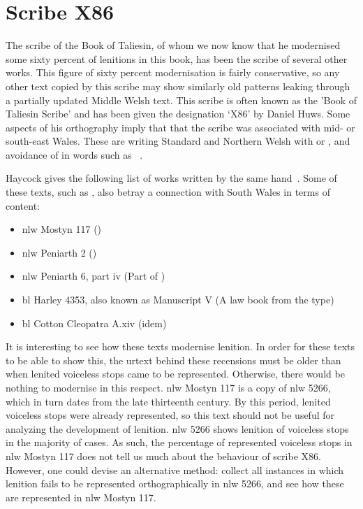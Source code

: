 \chapter{Scribe X86}
The scribe of the Book of Taliesin, of whom we now know that he modernised some sixty percent of lenitions in this book, has been the scribe of several other works. This figure of sixty percent modernisation is fairly conservative, so any other text copied by this scribe may show similarly old patterns leaking through a partially updated Middle Welsh text. This scribe is often known as the  'Book of Taliesin Scribe' and has been given the designation `X86' by Daniel Huws. Some aspects of his orthography imply that that the scribe was associated with mid- or south-east Wales. These are writing Standard and Northern Welsh  with  or , and avoidance of \mw{\ci} in words such as ~\autocite[2]{haycock_legendary_2015}.  

Haycock gives the following list of works written by the same hand~\autocite[2]{haycock_legendary_2015}. Some of these texts, such as , also betray a connection with South Wales in terms of content:

\begin{itemize}
    \item \gls{nlw} Mostyn 117 ()
    \item \gls{nlw} Peniarth 2 ()
    \item \gls{nlw} Peniarth 6, part iv (Part of )
    \item \gls{bl} Harley 4353, also known as Manuscript V (A law book from the  type)
    \item \gls{bl} Cotton Cleopatra A.xiv (idem)
\end{itemize}

It is interesting to see how these texts modernise lenition. In order for these texts to be able to show this, the urtext behind these recensions must be older than when lenited voiceless stops came to be represented. Otherwise, there would be nothing to modernise in this respect. \gls{nlw} Mostyn 117 is a copy of \gls{nlw} 5266, which in turn dates from the late thirteenth century. By this period, lenited voiceless stops were already represented, so this text should not be useful for analyzing the development of lenition. \gls{nlw} 5266 shows lenition of voiceless stops in the majority of cases. As such, the percentage of represented voiceless stops in \gls{nlw} Mostyn 117 does not tell us much about the behaviour of scribe X86. However, one could devise an alternative method: collect all instances in which lenition fails to be represented orthographically in \gls{nlw} 5266, and see how these are represented in \gls{nlw} Mostyn 117.

